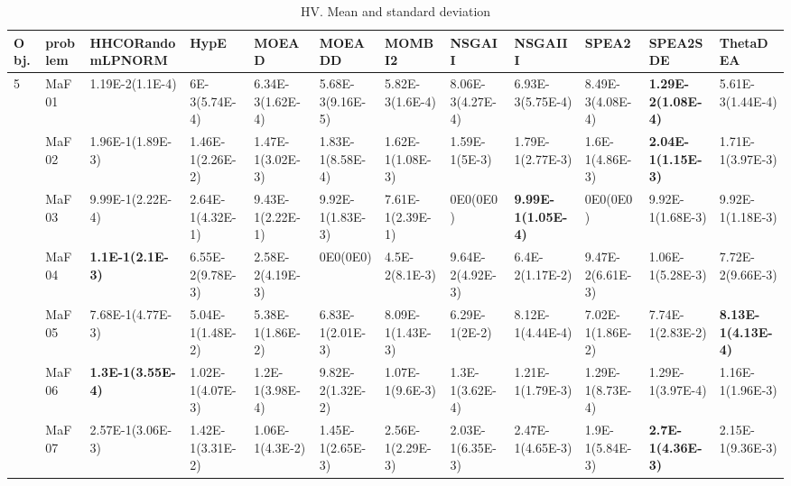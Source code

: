 \documentclass[]{article}
\begin{document}
\begin{landscape}
\begin{table}
\caption{HV. Mean and standard deviation}
\label{table:mean.HV}
\centering
\begin{footnotesize}
\begin{tabular}{|l|l|l|l|l|l|l|l|l|l|l|l|}
\hline
Obj. & problem  & HHCORandomLPNORM & HypE & MOEAD & MOEADD & MOMBI2 & NSGAII & NSGAIII & SPEA2 & SPEA2SDE & ThetaDEA \\ \hline

\multirow{15}{*}{5} & MaF01 & \cellcolor{gray95} 1.19E-2(1.1E-4) & 6E-3(5.74E-4) & 6.34E-3(1.62E-4) & 5.68E-3(9.16E-5) & 5.82E-3(1.6E-4) & \cellcolor{gray95} 8.06E-3(4.27E-4) & 6.93E-3(5.75E-4) & \cellcolor{gray95} 8.49E-3(4.08E-4) & \cellcolor{gray95} {\bf 1.29E-2(1.08E-4)} & 5.61E-3(1.44E-4)\\
 & MaF02 & \cellcolor{gray95} 1.96E-1(1.89E-3) & 1.46E-1(2.26E-2) & 1.47E-1(3.02E-3) & \cellcolor{gray95} 1.83E-1(8.58E-4) & 1.62E-1(1.08E-3) & 1.59E-1(5E-3) & 1.79E-1(2.77E-3) & 1.6E-1(4.86E-3) & \cellcolor{gray95} {\bf 2.04E-1(1.15E-3)} & 1.71E-1(3.97E-3)\\
 & MaF03 & \cellcolor{gray95} 9.99E-1(2.22E-4) & 2.64E-1(4.32E-1) & 9.43E-1(2.22E-1) & 9.92E-1(1.83E-3) & 7.61E-1(2.39E-1) & 0E0(0E0) & \cellcolor{gray95} {\bf 9.99E-1(1.05E-4)} & 0E0(0E0) & 9.92E-1(1.68E-3) & 9.92E-1(1.18E-3)\\
 & MaF04 & \cellcolor{gray95} {\bf 1.1E-1(2.1E-3)} & 6.55E-2(9.78E-3) & 2.58E-2(4.19E-3) & 0E0(0E0) & 4.5E-2(8.1E-3) & \cellcolor{gray95} 9.64E-2(4.92E-3) & 6.4E-2(1.17E-2) & \cellcolor{gray95} 9.47E-2(6.61E-3) & \cellcolor{gray95} 1.06E-1(5.28E-3) & 7.72E-2(9.66E-3)\\
 & MaF05 & 7.68E-1(4.77E-3) & 5.04E-1(1.48E-2) & 5.38E-1(1.86E-2) & 6.83E-1(2.01E-3) & \cellcolor{gray95} 8.09E-1(1.43E-3) & 6.29E-1(2E-2) & \cellcolor{gray95} 8.12E-1(4.44E-4) & 7.02E-1(1.86E-2) & 7.74E-1(2.83E-2) & \cellcolor{gray95} {\bf 8.13E-1(4.13E-4)}\\
 & MaF06 & \cellcolor{gray95} {\bf 1.3E-1(3.55E-4)} & 1.02E-1(4.07E-3) & 1.2E-1(3.98E-4) & 9.82E-2(1.32E-2) & 1.07E-1(9.6E-3) & \cellcolor{gray95} 1.3E-1(3.62E-4) & 1.21E-1(1.79E-3) & \cellcolor{gray95} 1.29E-1(8.73E-4) & \cellcolor{gray95} 1.29E-1(3.97E-4) & 1.16E-1(1.96E-3)\\
 & MaF07 & \cellcolor{gray95} 2.57E-1(3.06E-3) & 1.42E-1(3.31E-2) & 1.06E-1(4.3E-2) & 1.45E-1(2.65E-3) & \cellcolor{gray95} 2.56E-1(2.29E-3) & 2.03E-1(6.35E-3) & 2.47E-1(4.65E-3) & 1.9E-1(5.84E-3) & \cellcolor{gray95} {\bf 2.7E-1(4.36E-3)} & 2.15E-1(9.36E-3)\\

\end{tabular}
\end{footnotesize}
\end{table}
\end{landscape}
\end{document}

